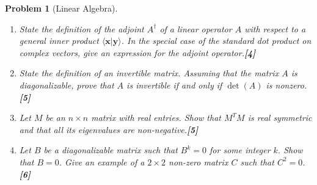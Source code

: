 \documentclass[a4paper]{article}
\theoremstyle{new}
\newtheorem{qns}{Problem}[section]
\begin{document}
\begin{qns}[Linear Algebra]\leavevmode
\begin{enumerate}[label=(\alph*)]
\item State the definition of the adjoint $A^\dag$ of a linear operator $A$ with respect to a general inner product $\langle\mathbf{x}|\mathbf{y}\rangle$. In the special case of the standard dot product on complex vectors, give an expression for the adjoint operator.\hfill\textbf{[4]}
\item State the definition of an invertible matrix. Assuming that the matrix $A$ is diagonalizable, prove that $A$ is invertible if and only if $\det(A)$ is nonzero.\hfill\textbf{[5]}
\item Let $M$ be an $n\times n$ matrix with real entries. Show that $M^TM$ is real symmetric and that all its eigenvalues are non-negative.\hfill\textbf{[5]}
\item Let $B$ be a diagonalizable matrix such that $B^k = 0$ for some integer $k$. Show that $B = 0$. Give an example of a $2\times 2$ non-zero matrix $C$ such that $C^2 = 0$. \hfill\textbf{[6]}
\end{enumerate}
\end{qns}
\end{document}
